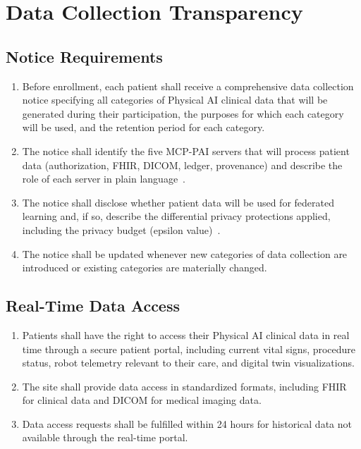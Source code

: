 \section{Data Collection Transparency}

\subsection{Notice Requirements}

\begin{enumerate}[label=(\alph*)]
\item Before enrollment, each patient shall receive a comprehensive data
  collection notice specifying all categories of Physical AI clinical data that
  will be generated during their participation, the purposes for which each
  category will be used, and the retention period for each category.

\item The notice shall identify the five MCP-PAI servers that will process
  patient data (authorization, FHIR, DICOM, ledger, provenance) and describe
  the role of each server in plain language~\cite{iche6r3adapt}.

\item The notice shall disclose whether patient data will be used for federated
  learning and, if so, describe the differential privacy protections applied,
  including the privacy budget (epsilon value)~\cite{patientjourney2026}.

\item The notice shall be updated whenever new categories of data collection are
  introduced or existing categories are materially changed.
\end{enumerate}

\subsection{Real-Time Data Access}

\begin{enumerate}[label=(\alph*)]
\item Patients shall have the right to access their Physical AI clinical data
  in real time through a secure patient portal, including current vital signs,
  procedure status, robot telemetry relevant to their care, and digital twin
  visualizations.

\item The site shall provide data access in standardized formats, including
  FHIR for clinical data and DICOM for medical imaging data.

\item Data access requests shall be fulfilled within 24 hours for historical
  data not available through the real-time portal.
\end{enumerate}

